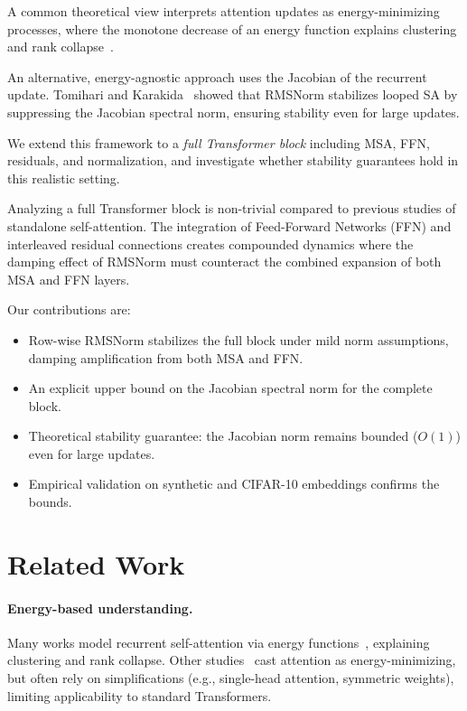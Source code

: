 \documentclass{zapiski}
\theoremstyle{plain}
\theoremstyle{definition}
\theoremstyle{remark}
\begin{document}
A common theoretical view interprets attention updates as energy-minimizing processes, where the monotone decrease of an energy function explains clustering and rank collapse~\cite{ramsauer2020hopfield,yang2022transformers,hoover2024energy,geshkovski2023mathematical,geshkovski2024emergence,geshkovski2024dynamic,bruno2025emergence}.  

An alternative, energy-agnostic approach uses the Jacobian of the recurrent update. Tomihari and Karakida~\cite{tomihari2025recurrentselfattentiondynamicsenergyagnostic} showed that RMSNorm stabilizes looped SA by suppressing the Jacobian spectral norm, ensuring stability even for large updates.

We extend this framework to a \textit{full Transformer block} including MSA, FFN, residuals, and normalization, and investigate whether stability guarantees hold in this realistic setting.

Analyzing a full Transformer block is non-trivial compared to previous studies of standalone self-attention. The integration of Feed-Forward Networks (FFN) and interleaved residual connections creates compounded dynamics where the damping effect of RMSNorm must counteract the combined expansion of both MSA and FFN layers.

Our contributions are:
\begin{itemize}
    \item Row-wise RMSNorm stabilizes the full block under mild norm assumptions, damping amplification from both MSA and FFN.
    \item An explicit upper bound on the Jacobian spectral norm for the complete block.
    \item Theoretical stability guarantee: the Jacobian norm remains bounded ($O(1)$) even for large updates.
    \item Empirical validation on synthetic and CIFAR-10 embeddings confirms the bounds.
\end{itemize}


\section{Related Work}

\paragraph{Energy-based understanding.}
Many works model recurrent self-attention via energy functions~\cite{geshkovski2023mathematical,geshkovski2024emergence,geshkovski2024dynamic,bruno2025emergence,karagodin2024clustering}, explaining clustering and rank collapse. Other studies~\cite{yang2022transformers,ramsauer2020hopfield,hoover2024energy} cast attention as energy-minimizing, but often rely on simplifications (e.g., single-head attention, symmetric weights), limiting applicability to standard Transformers.
\end{document}
